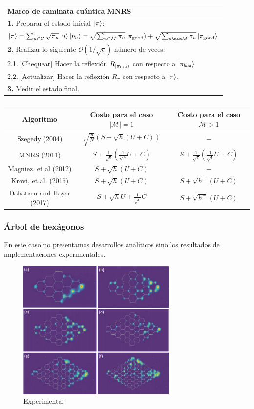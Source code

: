 \begin{center}
    \begin{tabular}{l}
    \hline \textbf{Marco de caminata cuántica MNRS} \\\hline 
    \textbf{1.} Preparar el estado inicial $\ket{\pi}$:\\
    $\ket{\pi}=\sum_{u\in G}\sqrt{\pi_u}\ket{u}\ket{p_u}=\sqrt{\sum_{u\in M}\pi_u}\ket{\pi_{\text{good}}}+\sqrt{\sum_{u\nin M}\pi_u}\ket{\pi_{\text{good}}}$\\
    \textbf{2.} Realizar lo siguiente $\mathcal{O}(1/\sqrt{\epsilon})$  número de veces:\\
    2.1. $[$Chequear$]$ Hacer la reflexión $R_{\ket{\pi_{\text{bad}}}}$ con respecto a $\ket{\pi_{bad}}$\\
    2.2. $[$Actualizar$]$ Hacer la reflexión $R_{\pi}$ con respecto a $\ket{\pi}$.\\
    \textbf{3.} Medir el estado final.\\\hline
    \end{tabular}{}
\end{center}{}
\begin{table}[h]
    \centering
    \begin{tabular}{|c|c|c|}
    \hline  
    Algoritmo & Costo para el caso $|\mathcal{M}|=1$ & Costo para el caso $\mathcal{M}>1$ \\\hline\hline
    Szegedy\cite{szegedy2004quantum} (2004)& $\sqrt{\frac{h}{N}}(S+\sqrt{h}(U+C))$ & $-$ \\\hline   
    MNRS (2011)&$S+\frac{1}{\sqrt{\epsilon}}(\frac{1}{\sqrt{\delta}}U+C)$ & $S+\frac{1}{\sqrt{\epsilon}}(\frac{1}{\sqrt{\epsilon}}U+C)$ \\\hline
    Magniez, et al (2012) & $S+\sqrt{h}(U+C)$ & $-$\\\hline
    Krovi, et al. (2016)& $S+\sqrt{h}(U+C)$&$S+\sqrt{h^+}(U+C)$
    \\\hline
    Dohotaru and Hoyer (2017)&$S+\sqrt{h}U+\frac{1}{\sqrt{\epsilon}}C$&$S+\sqrt{h^+}(U+C)$\\\hline
    \end{tabular}
    \caption{\cite{shao}}
    \label{AlgoritmosBusqueda}
\end{table}{}

\subsubsection*{Árbol de hexágonos}
En este caso no presentamos desarrollos analíticos sino los resultados de implementaciones experimentales. 

\begin{figure}[ht]
\centering
\includegraphics[width=0.7\textwidth]{Kap5/HexagonWalkTang2018.png}
\caption{Experimental }
\end{figure}
